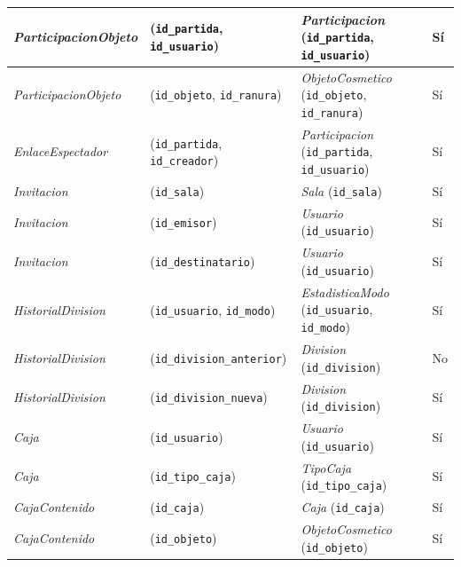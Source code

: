 \begin{center}
\begin{longtable}{|L{0.21\textwidth}|L{0.26\textwidth}|L{0.29\textwidth}|L{0.12\textwidth}|}
\textit{Participacion\-Objeto} & (\texttt{id\_\allowbreak{}partida}, \texttt{id\_\allowbreak{}usuario}) & \textit{Participacion} (\texttt{id\_\allowbreak{}partida}, \texttt{id\_\allowbreak{}usuario}) & Sí \\ \hline
\textit{Participacion\-Objeto} & (\texttt{id\_\allowbreak{}objeto}, \texttt{id\_\allowbreak{}ranura}) & \textit{Objeto\-Cosmetico} (\texttt{id\_\allowbreak{}objeto}, \texttt{id\_\allowbreak{}ranura}) & Sí \\ \hline
\textit{Enlace\-Espectador} & (\texttt{id\_\allowbreak{}partida}, \texttt{id\_\allowbreak{}creador}) & \textit{Participacion} (\texttt{id\_\allowbreak{}partida}, \texttt{id\_\allowbreak{}usuario}) & Sí \\ \hline
\textit{Invitacion} & (\texttt{id\_\allowbreak{}sala}) & \textit{Sala} (\texttt{id\_\allowbreak{}sala}) & Sí \\ \hline
\textit{Invitacion} & (\texttt{id\_\allowbreak{}emisor}) & \textit{Usuario} (\texttt{id\_\allowbreak{}usuario}) & Sí \\ \hline
\textit{Invitacion} & (\texttt{id\_\allowbreak{}destinatario}) & \textit{Usuario} (\texttt{id\_\allowbreak{}usuario}) & Sí \\ \hline
\textit{Historial\-Division} & (\texttt{id\_\allowbreak{}usuario}, \texttt{id\_\allowbreak{}modo}) & \textit{Estadistica\-Modo} (\texttt{id\_\allowbreak{}usuario}, \texttt{id\_\allowbreak{}modo}) & Sí \\ \hline
\textit{Historial\-Division} & (\texttt{id\_\allowbreak{}division\_\allowbreak{}anterior}) & \textit{Division} (\texttt{id\_\allowbreak{}division}) & No \\ \hline
\textit{Historial\-Division} & (\texttt{id\_\allowbreak{}division\_\allowbreak{}nueva}) & \textit{Division} (\texttt{id\_\allowbreak{}division}) & Sí \\ \hline
\textit{Caja} & (\texttt{id\_\allowbreak{}usuario}) & \textit{Usuario} (\texttt{id\_\allowbreak{}usuario}) & Sí \\ \hline
\textit{Caja} & (\texttt{id\_\allowbreak{}tipo\_\allowbreak{}caja}) & \textit{Tipo\-Caja} (\texttt{id\_\allowbreak{}tipo\_\allowbreak{}caja}) & Sí \\ \hline
\textit{Caja\-Contenido} & (\texttt{id\_\allowbreak{}caja}) & \textit{Caja} (\texttt{id\_\allowbreak{}caja}) & Sí \\ \hline
\textit{Caja\-Contenido} & (\texttt{id\_\allowbreak{}objeto}) & \textit{Objeto\-Cosmetico} (\texttt{id\_\allowbreak{}objeto}) & Sí \\ \hline

\end{longtable}
\end{center}

